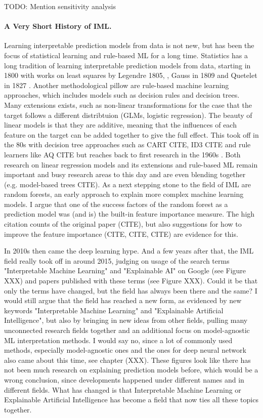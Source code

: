 \documentclass[runningheads]{llncs}
\begin{document}
TODO: Mention sensitivity analysis


\paragraph{A Very Short History of IML.}
Learning interpretable prediction models from data is not new, but has been the focus of statistical learning and rule-based ML for a long time.
Statistics has a long tradition of learning interpretable prediction  models from data, starting in 1800 \cite{stigler1986history} with works on least squares by Legendre 1805, \cite{legendre1805nouvelles}, Gauss in 1809 \cite{gauss1809theoria} and Quetelet in 1827 \cite{quetelet1827recherches}.
Another methodological pillow are rule-based machine learning approaches, which includes models such as decision rules and decision trees.
Many extensions exists, such as non-linear transformations for the case that the target follows a different distribtuion (GLMs, logistic regression).
The beauty of linear models is that they are additive, meaning that the influences of each feature on the target can be added together to give the full effect.
  This took off in the 80s with decision tree approaches such as CART CITE, ID3 CITE and rule learners like AQ CITE but reaches back to first research in the 1960s \cite{hajek1966guha}.
Both research on linear regression models and its extensions and rule-based ML remain important and busy research areas to this day and are even blending together (e.g. model-based trees CITE).
As a next stepping stone to the field of IML are random forests, an early approach to explain more complex machine learning models.
I argue that one of the success factors of the random forest as a prediction model was (and is) the built-in feature importance measure.
The high citation counts of the original paper (CITE), but also suggestions for how to improve the feature importance (CITE, CITE, CITE) are evidence for this.

In 2010s then came the deep learning hype.
And a few years after that, the IML field really took off in around 2015, judging on usage of the search terms "Interpretable Machine Learning" and "Explainable AI" on Google (see Figure XXX) and papers published with these terms (see Figure XXX).
Could it be that only the terms have changed, but the field has always been there and the same?
I would still argue that the field has reached a new form, as evidenced by new keywords "Interpretable Machine Learning" and "Explainable Artificial Intelligence", but also by bringing in new ideas from other fields, pulling many unconnected research fields together and an additional focus on model-agnostic ML interpretation methods.
I would say no, since a lot of commonly used methods, especially model-agnostic ones and the ones for deep neural network also came about this time, see chapter (XXX).
These figures look like there has not been much research on explaining prediction models before, which would be a wrong conclusion, since developments happened under different names and in different fields.
What has changed is that Interpretable Machine Learning or Explainable Artificial Intelligence has become a field that now ties all these topics together.
\end{document}

